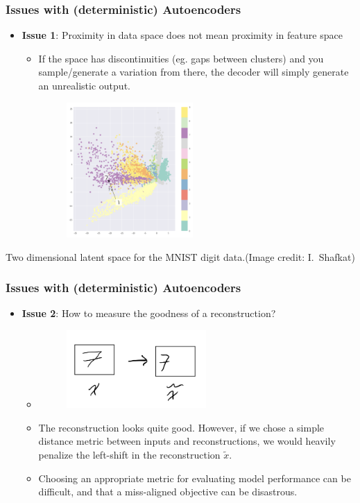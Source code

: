 \documentclass[handout,aspectratio=169]{beamer}
\begin{document}
\begin{frame}
  \frametitle{Issues with (deterministic) Autoencoders}

  \begin{itemize}
  \item \textbf{Issue 1}: Proximity in data space does not mean proximity in feature space
    \begin{itemize}
    \item If the space has discontinuities (eg. gaps between clusters) and you sample/generate a variation from there, the decoder will simply generate an unrealistic output.

      \begin{figure}
      \includegraphics[width=1.9in]{pics/mnist-ae}
      \end{figure}
    \end{itemize}
  \end{itemize}
  {\tiny Two dimensional latent space for the MNIST digit data.(Image credit: I.~Shafkat)}
\end{frame}


\begin{frame}
  \frametitle{Issues with (deterministic) Autoencoders}

  \begin{itemize}
  \item \textbf{Issue 2}: How to measure the goodness of a reconstruction?
    \begin{itemize}
    \item[] \begin{figure}
        \centering
        \includegraphics[width=2.1in]{pics/lecture_10_2.png}
      \end{figure}
    \item The reconstruction looks quite good. However, if we chose a simple distance metric between inputs and reconstructions, we would heavily penalize the left-shift in the reconstruction  $\tilde x$.
    \item Choosing an appropriate metric for evaluating model performance can be difficult, and that a miss-aligned objective can be disastrous.
    \end{itemize}
  \end{itemize}
\end{frame}
\end{document}
